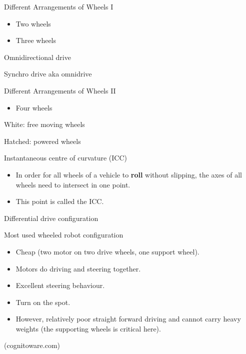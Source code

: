 \documentclass[compress]{beamer}
\begin{document}
\begin{frame}{Different Arrangements of Wheels I}

\begin{itemize}
    \item Two wheels
    \item Three wheels
\end{itemize}

Omnidirectional drive

Synchro drive aka omnidrive

\end{frame}

\begin{frame}{Different Arrangements of Wheels II}

\begin{itemize}
    \item Four wheels
\end{itemize}

White: free moving wheels

Hatched: powered wheels

\end{frame}

\begin{frame}{Instantaneous centre of curvature (ICC)}

\begin{itemize}
    \item In order for all wheels of a vehicle to \textbf{roll} without
  slipping, the axes of all wheels need to intersect in one point.
    \item This point is called the ICC.
\end{itemize}

\end{frame}

\begin{frame}{Differential drive configuration}

Most used wheeled robot configuration

\begin{itemize}
    \item Cheap (two motor on two drive wheels, one support wheel).
    \item Motors do driving and steering together.
    \item Excellent steering behaviour.
    \item Turn on the spot.
    \item However, relatively poor straight forward driving and cannot carry
  heavy weights (the supporting wheels is critical here).
\end{itemize}

(cognitoware.com)

\end{frame}
\end{document}
